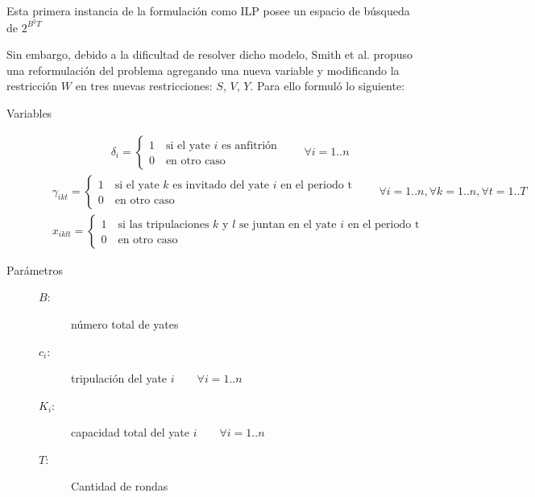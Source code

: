 \documentclass[letter, 10pt]{article}
\begin{document}
Esta primera instancia de la formulación como ILP posee un espacio de búsqueda de $2^{B^2T}$

Sin embargo, debido a la dificultad de resolver dicho modelo, Smith et al.\cite{Smith1996} propuso una reformulación del problema agregando una nueva variable y modificando la restricción $W$ en tres nuevas restricciones: $S$, $V$, $Y$. Para ello formuló lo siguiente:

\begin{description}
    \item[Variables] \hfill
      \begin{align*}
        &\delta_i = \begin{cases} 1 \quad \text{si el yate $i$ es anfitrión} \\ 0 \quad \text{en otro caso} \end{cases}
        \qquad \forall i=1..n
      \end{align*}
    \begin{align*}
        &\gamma_{ikt} = \begin{cases} 1 \quad \text{si el yate $k$ es invitado del yate $i$ en el periodo t} \\ 0 \quad \text{en otro caso} \end{cases}
        \qquad \forall i=1..n, \forall k=1..n, \forall t=1..T
      \end{align*}
      \begin{align*}
        &x_{iklt} = \begin{cases} 1 \quad \text{si las tripulaciones $k$ y $l$ se juntan en el yate $i$ en el periodo t} \\ 0 \quad \text{en otro caso} \end{cases}
      \end{align*}
  \item[Parámetros] \hfill
    \begin{description}
      \item[$B$:] número total de yates
      \item[$c_i$:] tripulación del yate $i \qquad \forall i=1..n$
      \item[$K_i$:] capacidad total del yate $i \qquad \forall i=1..n$
      \item[$T$:] Cantidad de rondas
    \end{description}


\end{description}
\end{document}
